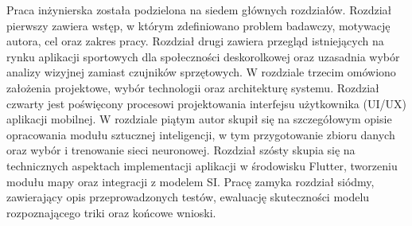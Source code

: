         Praca inżynierska została podzielona na siedem głównych rozdziałów. Rozdział pierwszy zawiera wstęp, w którym zdefiniowano problem badawczy, motywację autora, cel oraz zakres pracy. Rozdział drugi zawiera przegląd istniejących na rynku aplikacji sportowych dla społeczności deskorolkowej oraz uzasadnia wybór analizy wizyjnej zamiast czujników sprzętowych. W rozdziale trzecim omówiono założenia projektowe, wybór technologii oraz architekturę systemu. Rozdział czwarty jest poświęcony procesowi projektowania interfejsu użytkownika (UI/UX) aplikacji mobilnej. W rozdziale piątym autor skupił się na szczegółowym opisie opracowania modułu sztucznej inteligencji, w tym przygotowanie zbioru danych oraz wybór i trenowanie sieci neuronowej. Rozdział szósty skupia się na technicznych aspektach implementacji aplikacji w środowisku Flutter, tworzeniu modułu mapy oraz integracji z modelem SI. Pracę zamyka rozdział siódmy, zawierający opis przeprowadzonych testów, ewaluację skuteczności modelu rozpoznającego triki oraz końcowe wnioski.
        